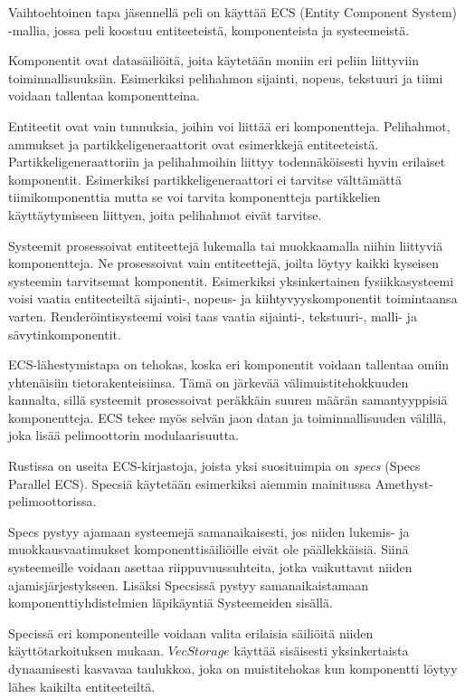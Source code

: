 \documentclass[finnish]{tktltiki2}
\theoremstyle{definition}
\theoremstyle{remark}
\begin{document}
Vaihtoehtoinen tapa jäsennellä peli on käyttää ECS (Entity Component System) -mallia, jossa peli koostuu entiteeteistä, komponenteista ja systeemeistä.

Komponentit ovat datasäiliöitä, joita käytetään moniin eri peliin liittyviin toiminnallisuuksiin. Esimerkiksi pelihahmon sijainti, nopeus, tekstuuri ja tiimi voidaan tallentaa komponentteina.

Entiteetit ovat vain tunnuksia, joihin voi liittää eri komponentteja. Pelihahmot, ammukset ja partikkeligeneraattorit ovat esimerkkejä entiteeteistä. Partikkeligeneraattoriin ja pelihahmoihin liittyy todennäköisesti hyvin erilaiset komponentit. Esimerkiksi partikkeligeneraattori ei tarvitse välttämättä tiimikomponenttia mutta se voi tarvita komponentteja partikkelien käyttäytymiseen liittyen, joita pelihahmot eivät tarvitse.

Systeemit prosessoivat entiteettejä lukemalla tai muokkaamalla niihin liittyviä komponentteja. Ne prosessoivat vain entiteettejä, joilta löytyy kaikki kyseisen systeemin tarvitsemat komponentit. Esimerkiksi yksinkertainen fysiikkasysteemi voisi vaatia entiteeteiltä sijainti-, nopeus- ja kiihtyvyyskomponentit toimintaansa varten. Renderöintisysteemi voisi taas vaatia sijainti-, tekstuuri-, malli- ja sävytinkomponentit.

ECS-lähestymistapa on tehokas, koska eri komponentit voidaan tallentaa omiin yhtenäisiin tietorakenteisiinsa. Tämä on järkevää välimuistitehokkuuden kannalta, sillä systeemit prosessoivat peräkkäin suuren määrän samantyyppisiä komponentteja. ECS tekee myös selvän jaon datan ja toiminnallisuuden välillä, joka lisää pelimoottorin modulaarisuutta.

Rustissa on useita ECS-kirjastoja, joista yksi suosituimpia on \textit{specs} (Specs Parallel ECS)\cite{AreWeGameYetEcs}. Specsiä käytetään esimerkiksi aiemmin mainitussa Amethyst-pelimoottorissa. 

Specs pystyy ajamaan systeemejä samanaikaisesti, jos niiden lukemis- ja muokkausvaatimukset komponenttisäiliöille eivät ole päällekkäisiä. Siinä systeemeille voidaan asettaa riippuvuussuhteita, jotka vaikuttavat niiden ajamisjärjestykseen. Lisäksi Specsissä pystyy samanaikaistamaan komponenttiyhdistelmien läpikäyntiä Systeemeiden sisällä.

Specissä eri komponenteille voidaan valita erilaisia säiliöitä niiden käyttötarkoituksen mukaan. $VecStorage$ käyttää sisäisesti yksinkertaista dynaamisesti kasvavaa taulukkoa, joka on muistitehokas kun komponentti löytyy lähes kaikilta entiteeteiltä. 
\end{document}
